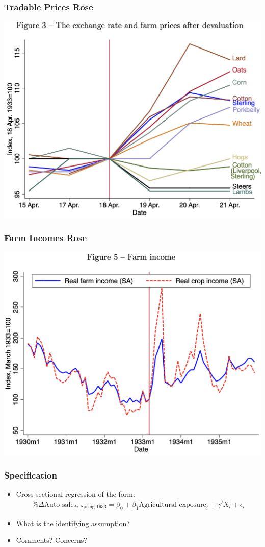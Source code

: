 \documentclass[english,xcolor=svgnames]{beamer}
\begin{document}
\begin{frame}
\frametitle[alignment=center]{Tradable Prices Rose}
\centering
\includegraphics[scale=0.5]{figures/HRWFIG3.png}
\end{frame}

\begin{frame}
\frametitle[alignment=center]{Farm Incomes Rose}
\centering
\includegraphics[scale=0.5]{figures/HRWFIG5.png}
\end{frame}


\begin{frame}
\frametitle[alignment=center]{Specification}
\begin{itemize}
	\item Cross-sectional regression of the form:
	\begin{align*}
		\%\Delta \text{Auto sales}_{i,\text{Spring 1933}} = \beta_0 + \beta_1 \text{Agricultural exposure}_i + \gamma'X_i+\epsilon_i
	\end{align*}
	\item What is the identifying assumption?
	\item Comments? Concerns?
\end{itemize}
\end{frame}
\end{document}
